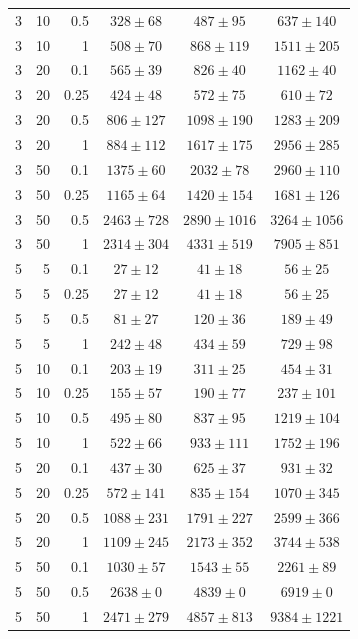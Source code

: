 \begin{table}[htbp]
\begin{tabular}{@{}rrrccc@{}}
3 & 10 & 0.5 & $328 \pm 68$ & $487 \pm 95$ & $637 \pm 140$ \\
3 & 10 & 1 & $508 \pm 70$ & $868 \pm 119$ & $1511 \pm 205$ \\
3 & 20 & 0.1 & $565 \pm 39$ & $826 \pm 40$ & $1162 \pm 40$ \\
3 & 20 & 0.25 & $424 \pm 48$ & $572 \pm 75$ & $610 \pm 72$ \\
3 & 20 & 0.5 & $806 \pm 127$ & $1098 \pm 190$ & $1283 \pm 209$ \\
3 & 20 & 1 & $884 \pm 112$ & $1617 \pm 175$ & $2956 \pm 285$ \\
3 & 50 & 0.1 & $1375 \pm 60$ & $2032 \pm 78$ & $2960 \pm 110$ \\
3 & 50 & 0.25 & $1165 \pm 64$ & $1420 \pm 154$ & $1681 \pm 126$ \\
3 & 50 & 0.5 & $2463 \pm 728$ & $2890 \pm 1016$ & $3264 \pm 1056$ \\
3 & 50 & 1 & $2314 \pm 304$ & $4331 \pm 519$ & $7905 \pm 851$ \\
\midrule
5 & 5 & 0.1 & $27 \pm 12$ & $41 \pm 18$ & $56 \pm 25$ \\
5 & 5 & 0.25 & $27 \pm 12$ & $41 \pm 18$ & $56 \pm 25$ \\
5 & 5 & 0.5 & $81 \pm 27$ & $120 \pm 36$ & $189 \pm 49$ \\
5 & 5 & 1 & $242 \pm 48$ & $434 \pm 59$ & $729 \pm 98$ \\
5 & 10 & 0.1 & $203 \pm 19$ & $311 \pm 25$ & $454 \pm 31$ \\
5 & 10 & 0.25 & $155 \pm 57$ & $190 \pm 77$ & $237 \pm 101$ \\
5 & 10 & 0.5 & $495 \pm 80$ & $837 \pm 95$ & $1219 \pm 104$ \\
5 & 10 & 1 & $522 \pm 66$ & $933 \pm 111$ & $1752 \pm 196$ \\
5 & 20 & 0.1 & $437 \pm 30$ & $625 \pm 37$ & $931 \pm 32$ \\
5 & 20 & 0.25 & $572 \pm 141$ & $835 \pm 154$ & $1070 \pm 345$ \\
5 & 20 & 0.5 & $1088 \pm 231$ & $1791 \pm 227$ & $2599 \pm 366$ \\
5 & 20 & 1 & $1109 \pm 245$ & $2173 \pm 352$ & $3744 \pm 538$ \\
5 & 50 & 0.1 & $1030 \pm 57$ & $1543 \pm 55$ & $2261 \pm 89$ \\
5 & 50 & 0.5 & $2638 \pm 0$ & $4839 \pm 0$ & $6919 \pm 0$ \\
5 & 50 & 1 & $2471 \pm 279$ & $4857 \pm 813$ & $9384 \pm 1221$ \\
\bottomrule
\end{tabular}
\end{table}
